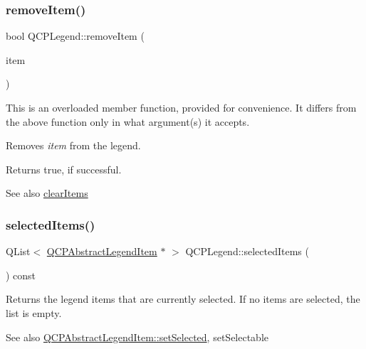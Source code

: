 \subsubsection{\texorpdfstring{remove\+Item()}{removeItem()}\hspace{0.1cm}{\footnotesize\ttfamily [2/2]}}
{\footnotesize\ttfamily bool Q\+C\+P\+Legend\+::remove\+Item (\begin{DoxyParamCaption}\item[{\mbox{\hyperlink{class_q_c_p_abstract_legend_item}{Q\+C\+P\+Abstract\+Legend\+Item}} $\ast$}]{item }\end{DoxyParamCaption})}

This is an overloaded member function, provided for convenience. It differs from the above function only in what argument(s) it accepts.

Removes {\itshape item} from the legend.

Returns true, if successful.

\begin{DoxySeeAlso}{See also}
\mbox{\hyperlink{class_q_c_p_legend_a24795c7250eb5214fcea16b7217b4dfb}{clear\+Items}} 
\end{DoxySeeAlso}
\mbox{\label{class_q_c_p_legend_ac7d9e567d5c551e09cd9bcc4306c5532}} 
\subsubsection{\texorpdfstring{selected\+Items()}{selectedItems()}}
{\footnotesize\ttfamily Q\+List$<$ \mbox{\hyperlink{class_q_c_p_abstract_legend_item}{Q\+C\+P\+Abstract\+Legend\+Item}} $\ast$ $>$ Q\+C\+P\+Legend\+::selected\+Items (\begin{DoxyParamCaption}{ }\end{DoxyParamCaption}) const}

Returns the legend items that are currently selected. If no items are selected, the list is empty.

\begin{DoxySeeAlso}{See also}
\mbox{\hyperlink{class_q_c_p_abstract_legend_item_a6eed93b0ab99cb3eabb043fb08179c2b}{Q\+C\+P\+Abstract\+Legend\+Item\+::set\+Selected}}, set\+Selectable 
\end{DoxySeeAlso}
\mbox{\label{class_q_c_p_legend_a82c88464edac07a9eefaf3906268df3b}} 
